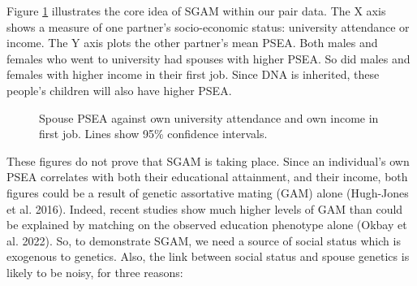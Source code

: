 \documentclass[
]{article}
\theoremstyle{definition}
\theoremstyle{definition}
\theoremstyle{definition}
\theoremstyle{definition}
\theoremstyle{remark}
\begin{document}
Figure \ref{fig:pic-basic-corr} illustrates the core idea of SGAM within our
pair data. The X axis shows a measure of one partner's socio-economic status:
university attendance or income. The Y axis plots the other partner's mean PSEA.
Both males and females who went to university had spouses with higher PSEA. So
did males and females with higher income in their first job. Since DNA is
inherited, these people's children will also have higher PSEA.

\begin{figure}

{\centering {}\newline{}

}

\caption{Spouse PSEA against own university attendance and own income in first job. Lines show 95\% confidence intervals.}\label{fig:pic-basic-corr}
\end{figure}

These figures do not prove that SGAM is taking place. Since an
individual's own PSEA correlates with both their educational attainment,
and their income, both figures could be a result of genetic assortative
mating (GAM) alone (Hugh-Jones et al. 2016). Indeed, recent studies show much
higher levels of GAM than could be explained by matching on the observed
education phenotype alone (Okbay et al. 2022). So, to demonstrate SGAM, we need
a source of social status which is exogenous to genetics. Also, the link
between social status and spouse genetics is likely to be noisy, for
three reasons:
\end{document}
